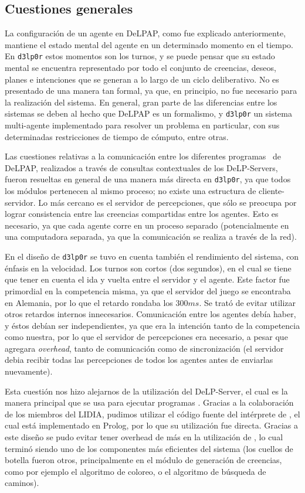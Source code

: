 \subsection{Cuestiones generales}

La configuración de un agente en DeLPAP, como fue explicado anteriormente, mantiene el estado mental
del agente en un determinado momento en el tiempo. En \texttt{d3lp0r} estos momentos son los turnos, y se 
puede pensar que su estado mental se encuentra representado por todo el conjunto de creencias, deseos,
planes e intenciones que se generan a lo largo de un ciclo deliberativo. No es presentado de una 
manera tan formal, ya que, en principio, no fue necesario para la realización del sistema. En general,
gran parte de las diferencias entre los sistemas se deben al hecho que DeLPAP es un formalismo, y 
\texttt{d3lp0r} un sistema multi-agente implementado para resolver un problema en particular, con sus 
determinadas restricciones de tiempo de cómputo, entre otras.

Las cuestiones relativas a la comunicación entre los diferentes programas \DLP\ de DeLPAP, realizados
a través de consultas contextuales de los DeLP-Servers, fueron resueltas en general de una manera más
directa en \texttt{d3lp0r}, ya que todos los módulos pertenecen al mismo proceso; no existe una estructura
de cliente-servidor. Lo más cercano es el servidor de percepciones, que sólo se preocupa por lograr
consistencia entre las creencias compartidas entre los agentes. Esto es necesario, ya que cada agente
corre en un proceso separado (potencialmente en una computadora separada, ya que la comunicación se
realiza a través de la red). 

En el diseño de \texttt{d3lp0r} se tuvo en cuenta también el rendimiento del sistema, con énfasis en la 
velocidad. Los turnos son cortos (dos segundos), en el cual se tiene que tener en cuenta el ida y 
vuelta entre el servidor y el agente. Este factor fue primordial en la competencia misma, ya que el 
servidor del juego se encontraba en Alemania, por lo que el retardo rondaba los $300 ms$. Se trató de
evitar utilizar otros retardos internos innecesarios. Comunicación entre los agentes debía haber, y 
éstos debían ser independientes, ya que era la intención tanto de la competencia como nuestra, por lo
que el servidor de percepciones era necesario, a pesar que agregara \textit{overhead}, tanto de 
comunicación como de sincronización (el servidor debia recibir todas las percepciones de todos los 
agentes antes de enviarlas nuevamente). 

Esta cuestión nos hizo alejarnos de la utilización del DeLP-Server, el cual es la manera principal
que se usa para ejecutar programas \DLP. Gracias a la colaboración de los miembros del LIDIA, pudimos 
utilizar el código fuente del intérprete de \DLP, el cual está implementado en Prolog, por lo que su
utilización fue directa. Gracias a este diseño se pudo evitar tener overhead de más en la utilización
de \DLP, lo cual terminó siendo uno de los componentes más eficientes del sistema (los cuellos de 
botella fueron otros, principalmente en el módulo de generación de creencias, como por ejemplo el 
algoritmo de coloreo, o el algoritmo de búsqueda de caminos).